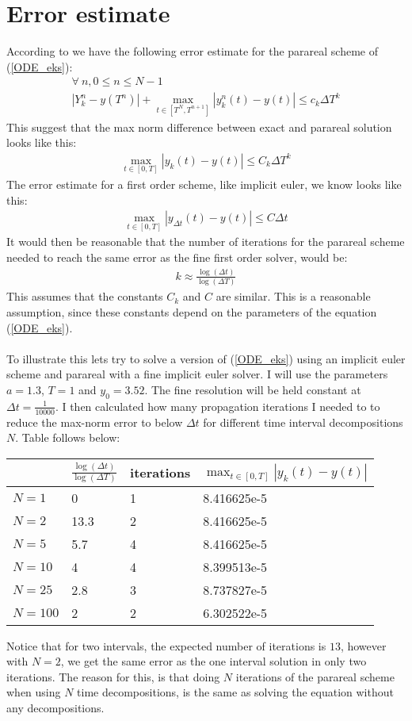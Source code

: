 \documentclass[11pt,a4paper]{article}
\begin{document}
\section{Error estimate}
According to \cite{lions2001resolution} we have the following error estimate for the parareal scheme of (\ref{ODE_eks}):
\begin{gather*}
\forall \ n,0\leq n\leq N-1 \\ |Y_k^n-y(T^n)| + \max_{t\in[T^N,T^{n+1}]}|y_k^n(t)-y(t)| \leq c_k\Delta T^k
\end{gather*} 
This suggest that the max norm difference between exact and parareal solution looks like this:
\begin{align*}
\max_{t\in[0,T]}|y_k(t)-y(t)| \leq C_k\Delta T^k
\end{align*}
The error estimate for a first order scheme, like implicit euler, we know looks like this:
\begin{align*}
\max_{t\in[0,T]}|y_{\Delta t}(t)-y(t)| \leq C\Delta t
\end{align*}
It would then be reasonable that the number of iterations for the parareal scheme needed to reach the same error as the fine first order solver, would be:
\begin{align*}
k\approx\frac{\log(\Delta t)}{\log(\Delta T)}
\end{align*}
This assumes that the constants $C_k$ and $C$ are similar. This is a reasonable assumption, since these constants depend on the parameters of the equation (\ref{ODE_eks}). 
\\
\\
To illustrate this lets try to solve a version of (\ref{ODE_eks}) using an implicit euler scheme and parareal with a fine implicit euler solver. I will use  the parameters $a=1.3$, $T=1$ and $y_0= 3.52$. The fine resolution will be held constant at $\Delta t=\frac{1}{10000}$. I then calculated how many propagation iterations I needed to to reduce the max-norm error to below $\Delta t$ for different time interval decompositions $N$. Table follows below:
 \begin{center}
    \begin{tabular}{| l | l | l | l |}
    \hline
     & $\frac{\log(\Delta t)}{\log(\Delta T)}$&iterations  & $\max_{t\in[0,T]}|y_k(t)-y(t)|$   \\ \hline
    $N=1$ &0 & 1& 8.416625e-5 	\\ \hline
    $N=2$ &13.3 &2& 8.416625e-5 	\\ \hline
    $N=5$ &5.7&4& 8.416625e-5	\\ \hline
    $N=10$ &4&4& 8.399513e-5	\\ \hline
    $N=25$ &2.8&3& 	8.737827e-5\\ \hline
    $N=100$ &2&2&	6.302522e-5\\ \hline
    \end{tabular}
\end{center}
Notice that for two intervals, the expected number of iterations is $13$, however with $N=2$, we get the same error as the one interval solution in only two iterations. The reason for this, is that doing $N$ iterations of the parareal scheme when using $N$ time decompositions, is the same as solving the equation without any decompositions. 
\end{document}
